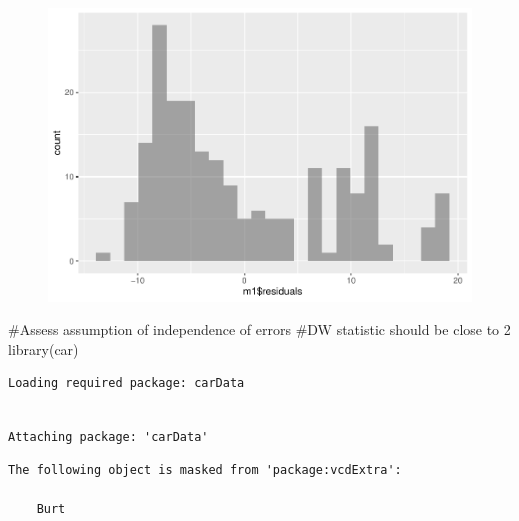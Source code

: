 \documentclass[
  letterpaper,
  DIV=11,
  numbers=noendperiod]{scrreprt}
\newenvironment{Shaded}{\begin{snugshade}}{\end{snugshade}}
\newcommand{\CommentTok}[1]{\textcolor[rgb]{0.37,0.37,0.37}{#1}}
\newcommand{\FunctionTok}[1]{\textcolor[rgb]{0.28,0.35,0.67}{#1}}
\newcommand{\NormalTok}[1]{\textcolor[rgb]{0.00,0.23,0.31}{#1}}
\newcommand{\SpecialCharTok}[1]{\textcolor[rgb]{0.37,0.37,0.37}{#1}}
\begin{document}
\begin{Shaded}
\end{Shaded}

\begin{figure}[H]

{\centering \includegraphics{analysis/SGC3A/5_sgc3A_exploration_files/figure-pdf/unnamed-chunk-9-6.pdf}

}

\end{figure}

\begin{Shaded}
\begin{Highlighting}[]
\CommentTok{\#Assess assumption of independence of errors}
\CommentTok{\#DW statistic should be close to 2}
\FunctionTok{library}\NormalTok{(car)}
\end{Highlighting}
\end{Shaded}

\begin{verbatim}
Loading required package: carData
\end{verbatim}

\begin{verbatim}

Attaching package: 'carData'
\end{verbatim}

\begin{verbatim}
The following object is masked from 'package:vcdExtra':

    Burt
\end{verbatim}
\end{document}
